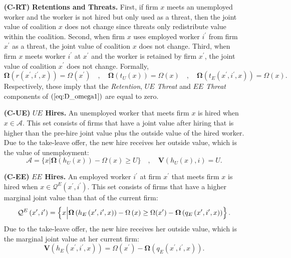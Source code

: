 \begin{enumerate}
\item[\textbf{(C-RT)}] \textbf{Retentions and Threats.} First, if firm $x$
meets an unemployed worker and the worker is not hired but only used as a
threat, then the joint value of coalition $x$ does not change since threats
only redistribute value within the coalition. Second, when firm $x$ uses employed worker $i^{\prime }$ from firm $x^{\prime }$ as a threat, the joint value of coalition $x$ does not change. Third, when firm $x$ meets worker $i^{\prime }$ at $x^{\prime }$ and the worker is retained by
firm $x^{\prime }$, the joint value of coalition $x^{\prime }$ does not change. Formally,
\begin{equation*}
\bm{\Omega }\left( r\left( x^{\prime },i^{\prime },x\right)
\right)=\Omega (x^{\prime })\quad,\quad \bm{\Omega }\left( t_{U}\left(
x\right) \right) =\Omega (x)\quad,\quad \bm{\Omega }\left( t_{E}\left(
x^{\prime },i^{\prime },x\right) \right)=\Omega (x).
\end{equation*}
Respectively, these imply that the \emph{Retention}, \emph{$UE$
Threat} and \emph{$EE$ Threat} components of $(\ref{eq:D_omega1})$ are equal
to zero.
\item[\textbf{(C-UE)}] \textbf{$UE$ Hires.} An unemployed worker that meets
firm $x$ is hired when $x\in\mathcal{A}$. This set consists of firms that
have a joint value after hiring that is higher than the pre-hire joint value
plus the outside value of the hired worker.
Due to the take-leave offer, the new hire receives her outside value, which is the value of unemployment:
\begin{equation*}
\mathcal{A}=\{x|\bm{\Omega}(h_{U}(x))-\Omega(x)\geq U\}
\quad,\quad
\bm{V}\left( h_{U}\left( x\right) ,i\right) =U.
\end{equation*}

\item[\textbf{(C-EE)}] \textbf{$EE$ Hires.} An employed worker $i^{\prime }$
at firm $x^{\prime }$ that meets firm $x$ is hired when $x\in \mathcal{Q}%
^{E}\left(x^{\prime },i^{\prime }\right)$. This set consists of firms that
have a higher marginal joint value than that of the current firm:
\begin{equation*}
\mathcal{Q}^{E}\left( x^{\prime },i^{\prime }\right) =\left\{ x\Big|\bm{%
\Omega }\left( h_{E}\left( x^{\prime },i^{\prime },x\right) \right) -\Omega
\left( x\right) \geq \Omega (x^{\prime })-\bm{\Omega }\left( q_{E}\left(
x^{\prime },i^{\prime },x\right) \right) \right\}.
\end{equation*}
Due to the take-leave offer, the new hire receives her
outside value, which is the
marginal joint value at her current firm:
\begin{equation*}
\bm{V}\left( h_{E}\left( x^{\prime },i^{\prime },x\right) \right)
=\Omega \left( x^{\prime }\right) -\bm{\Omega }\left( q_{E}\left(
x^{\prime },i^{\prime },x\right) \right) .
\end{equation*}


\end{enumerate}
